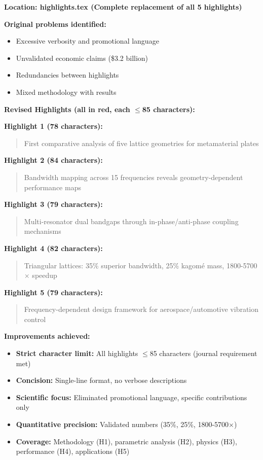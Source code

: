 \documentclass[11pt,a4paper]{article}
\newenvironment{changesbox}{%
    \par\medskip\noindent{\color{changescolor}\rule{\linewidth}{2pt}}\par
    \noindent{\color{changescolor}\bfseries Manuscript Changes}\par\smallskip
}{%
    \par\noindent{\color{changescolor}\rule{\linewidth}{0.5pt}}\medskip
}
\begin{document}
\begin{changesbox}
\textbf{Location: highlights.tex (Complete replacement of all 5 highlights)}

\textbf{Original problems identified:}
\begin{itemize}
    \item Excessive verbosity and promotional language
    \item Unvalidated economic claims (\$3.2 billion)
    \item Redundancies between highlights
    \item Mixed methodology with results
\end{itemize}

\textbf{Revised Highlights (all in red, each $\leq$85 characters):}

\textbf{Highlight 1 (78 characters):}
\begin{quote}
\textcolor{redtext}{First comparative analysis of five lattice geometries for metamaterial plates}
\end{quote}

\textbf{Highlight 2 (84 characters):}
\begin{quote}
\textcolor{redtext}{Bandwidth mapping across 15 frequencies reveals geometry-dependent performance maps}
\end{quote}

\textbf{Highlight 3 (79 characters):}
\begin{quote}
\textcolor{redtext}{Multi-resonator dual bandgaps through in-phase/anti-phase coupling mechanisms}
\end{quote}

\textbf{Highlight 4 (82 characters):}
\begin{quote}
\textcolor{redtext}{Triangular lattices: 35\% superior bandwidth, 25\% kagomé mass, 1800-5700$\times$ speedup}
\end{quote}

\textbf{Highlight 5 (79 characters):}
\begin{quote}
\textcolor{redtext}{Frequency-dependent design framework for aerospace/automotive vibration control}
\end{quote}

\textbf{Improvements achieved:}
\begin{itemize}
    \item \textbf{Strict character limit:} All highlights $\leq$85 characters (journal requirement met)
    \item \textbf{Concision:} Single-line format, no verbose descriptions
    \item \textbf{Scientific focus:} Eliminated promotional language, specific contributions only
    \item \textbf{Quantitative precision:} Validated numbers (35\%, 25\%, 1800-5700$\times$)
    \item \textbf{Coverage:} Methodology (H1), parametric analysis (H2), physics (H3), performance (H4), applications (H5)
\end{itemize}
\end{changesbox}
\end{document}
